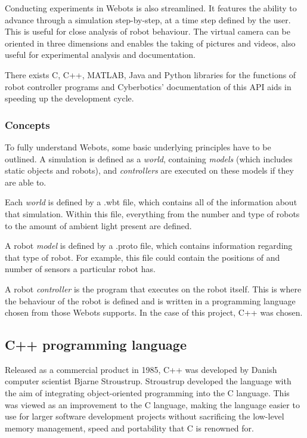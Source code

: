 Conducting experiments in Webots is also streamlined. It features the ability to advance through a simulation step-by-step, at a time step defined by the user. This is useful for close analysis of robot behaviour. The virtual camera can be oriented in three dimensions and enables the taking of pictures and videos, also useful for experimental analysis and documentation.

There exists C, C++, MATLAB, Java and Python libraries for the functions of robot controller programs and Cyberbotics' documentation of this API aids in speeding up the development cycle.

\subsubsection{Concepts}

To fully understand Webots, some basic underlying principles have to be outlined. A simulation is defined as a \textit{world}, containing \textit{models} (which includes static objects and robots), and \textit{controllers} are executed on these models if they are able to.

Each \textit{world} is defined by a .wbt file, which contains all of the information about that simulation. Within this file, everything from the number and type of robots to the amount of ambient light present are defined.

A robot \textit{model} is defined by a .proto file, which contains information regarding that type of robot. For example, this file could contain the positions of and number of sensors a particular robot has.

A robot \textit{controller} is the program that executes on the robot itself. This is where the behaviour of the robot is defined and is written in a programming language chosen from those Webots supports. In the case of this project, C++ was chosen.

\subsection{C++ programming language}

Released as a commercial product in 1985, C++ was developed by Danish computer scientist Bjarne Stroustrup. Stroustrup developed the language with the aim of integrating object-oriented programming into the C language. This was viewed as an improvement to the C language, making the language easier to use for larger software development projects without sacrificing the low-level memory management, speed and portability that C is renowned for. \cite{c++-history}

